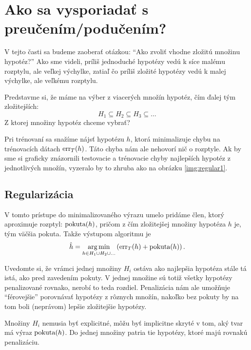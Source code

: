 \section{Ako sa vysporiadať s preučením/podučením?}

V tejto časti sa budeme zaoberať otázkou: ``Ako zvoliť vhodne zložitú
množinu hypotéz?'' Ako sme videli, príliš jednoduché hypotézy vedú
k síce malému rozptylu, ale veľkej výchylke, zatiaľ čo príliš zložité
hypotézy vedú k malej výchylke, ale veľkému rozptylu.

Predstavme si, že máme na výber z viacerých množín hypotéz, čím ďalej
tým zložitejších:
$$H_1 \subseteq H_2 \subseteq H_3 \subseteq \ldots$$
Z ktorej množiny hypotéz chceme vybrať?

Pri trénovaní sa snažíme nájsť hypotézu $h$, ktorá minimalizuje chybu
na trénovacích dátach $\mathrm{err}_T(h)$. Táto chyba nám ale nehovorí nič o rozptyle.
Ak by sme si graficky znázornili testovacie a trénovacie chyby najlepších
hypotéz z jednotlivých množín, vyzeralo by to zhruba ako na obrázku
\ref{img:regular1}.




\subsection{Regularizácia}

V tomto prístupe do minimalizovaného výrazu umelo pridáme člen, ktorý
aproximuje rozptyl: $\text{\normalfont pokuta}(h)$, pričom z čím zložitejšej množiny
hypotéza $h$ je, tým väčšia pokuta. Takže výstupom algoritmu je
$$\hat{h} = \operatorname*{arg\,min}_{h \in H_1 \cup H_2 \cup \ldots} \left( \mathrm{err}_T(h) + \text{\normalfont pokuta}(h) \right).$$

Uvedomte si, že vrámci jednej množiny $H_i$ ostáva ako najlepšia
hypotéza stále tá istá, ako pred zavedením pokuty. V jednej množine
sú totiž všetky hypotézy penalizované rovnako, nerobí to teda rozdiel.
Penalizácia nám ale umožňuje ``férovejšie'' porovnávať hypotézy z rôznych
množín, nakoľko bez pokuty by na tom boli (neprávom) lepšie
zložitejšie hypotézy.

Množiny $H_i$ nemusia byť explicitné, môžu byť implicitne skryté v tom,
aký tvar má výraz $\text{\normalfont pokuta}(h)$. Do jednej množiny patria tie hypotézy,
ktoré majú rovnakú penalizáciu.

